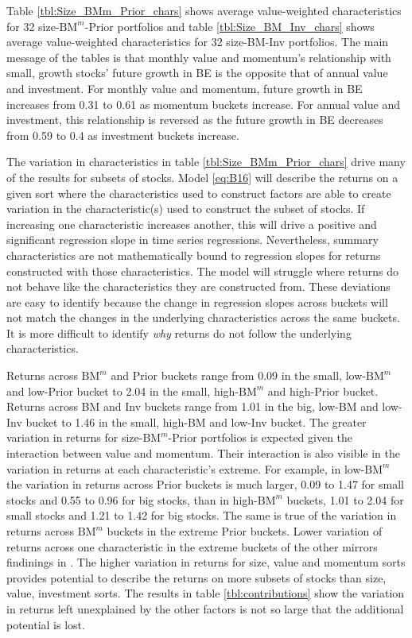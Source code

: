 
Table \ref{tbl:Size_BMm_Prior_chars} shows average value-weighted
characteristics for 32 size-$\text{BM}^m$-Prior portfolios and table
\ref{tbl:Size_BM_Inv_chars} shows average value-weighted characteristics for 32
size-BM-Inv portfolios. The main message of the tables is that monthly value
and momentum's relationship with small, growth stocks' future growth in BE is
the opposite that of annual value and investment. For monthly value and
momentum, future growth in BE increases from 0.31 to 0.61 as momentum buckets
increase. For annual value and investment, this relationship is reversed as the
future growth in BE decreases from 0.59 to 0.4 as investment buckets increase.

The variation in characteristics in table \ref{tbl:Size_BMm_Prior_chars} drive
many of the results for subsets of stocks. Model \ref{eq:B16} will describe the
returns on a given sort where the characteristics used to construct factors are
able to create variation in the characteristic(s) used to construct the subset
of stocks. If increasing one characteristic increases another, this will drive
a positive and significant regression slope in time series regressions.
Nevertheless, summary characteristics are not mathematically bound to
regression slopes for returns constructed with those characteristics. The model
will struggle where returns do not behave like the characteristics they are
constructed from. These deviations are easy to identify because the change in
regression slopes across buckets will not match the changes in the underlying
characteristics across the same buckets. It is more difficult to identify
\emph{why} returns do not follow the underlying characteristics.

Returns across $\text{BM}^m$ and Prior buckets range from 0.09 in the small,
low-$\text{BM}^m$ and low-Prior bucket to 2.04 in the small, high-$\text{BM}^m$
and high-Prior bucket. Returns across BM and Inv buckets range from 1.01 in the
big, low-BM and low-Inv bucket to 1.46 in the small, high-BM and low-Inv
bucket. The greater variation in returns for size-$\text{BM}^m$-Prior
portfolios is expected given the interaction between value and momentum. Their
interaction is also visible in the variation in returns at each
characteristic's extreme. For example, in low-$\text{BM}^m$ the variation in
returns across Prior buckets is much larger, 0.09 to 1.47 for small stocks and
0.55 to 0.96 for big stocks, than in high-$\text{BM}^m$ buckets, 1.01 to 2.04
for small stocks and 1.21 to 1.42 for big stocks. The same is true of the
variation in returns across $\text{BM}^m$ buckets in the extreme Prior buckets.
Lower variation of returns across one characteristic in the extreme buckets of
the other mirrors findinings in \textcite{asness2013devil}. The higher
variation in returns for size, value and momentum sorts provides potential to
describe the returns on more subsets of stocks than size, value, investment
sorts. The results in table \ref{tbl:contributions} show the variation in
returns left unexplained by the other factors is not so large that the
additional potential is lost.

